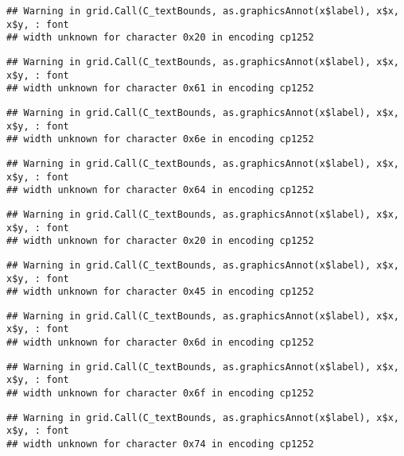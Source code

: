 \documentclass[
]{article}
\begin{document}
\begin{verbatim}
## Warning in grid.Call(C_textBounds, as.graphicsAnnot(x$label), x$x, x$y, : font
## width unknown for character 0x20 in encoding cp1252
\end{verbatim}

\begin{verbatim}
## Warning in grid.Call(C_textBounds, as.graphicsAnnot(x$label), x$x, x$y, : font
## width unknown for character 0x61 in encoding cp1252
\end{verbatim}

\begin{verbatim}
## Warning in grid.Call(C_textBounds, as.graphicsAnnot(x$label), x$x, x$y, : font
## width unknown for character 0x6e in encoding cp1252
\end{verbatim}

\begin{verbatim}
## Warning in grid.Call(C_textBounds, as.graphicsAnnot(x$label), x$x, x$y, : font
## width unknown for character 0x64 in encoding cp1252
\end{verbatim}

\begin{verbatim}
## Warning in grid.Call(C_textBounds, as.graphicsAnnot(x$label), x$x, x$y, : font
## width unknown for character 0x20 in encoding cp1252
\end{verbatim}

\begin{verbatim}
## Warning in grid.Call(C_textBounds, as.graphicsAnnot(x$label), x$x, x$y, : font
## width unknown for character 0x45 in encoding cp1252
\end{verbatim}

\begin{verbatim}
## Warning in grid.Call(C_textBounds, as.graphicsAnnot(x$label), x$x, x$y, : font
## width unknown for character 0x6d in encoding cp1252
\end{verbatim}

\begin{verbatim}
## Warning in grid.Call(C_textBounds, as.graphicsAnnot(x$label), x$x, x$y, : font
## width unknown for character 0x6f in encoding cp1252
\end{verbatim}

\begin{verbatim}
## Warning in grid.Call(C_textBounds, as.graphicsAnnot(x$label), x$x, x$y, : font
## width unknown for character 0x74 in encoding cp1252
\end{verbatim}
\end{document}
